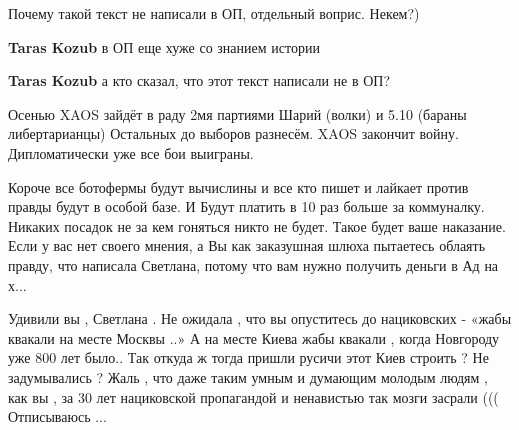 \begin{itemize}
\begin{itemize}
\end{itemize}

 
Почему такой текст не написали в ОП, отдельный воприс. Некем?)

\begin{itemize}
 
\textbf{Taras Kozub} в ОП еще хуже со знанием истории

 
\textbf{Taras Kozub} а кто сказал, что этот текст написали не в ОП?

 

Осенью XAOS зайдёт в раду 2мя партиями Шарий (волки) и 5.10 (бараны
либертарианцы) Остальных до выборов разнесём. XAOS закончит войну.
Дипломатически уже все бои выиграны.

Короче все ботофермы будут вычислины и все кто пишет и лайкает против правды
будут в особой базе. И Будут платить в 10 раз больше за коммуналку. Никаких
посадок не за кем гоняться никто не будет. Такое будет ваше наказание. Если у
вас нет своего мнения, а Вы как заказушная шлюха пытаетесь облаять правду, что
написала Светлана, потому что вам нужно получить деньги в Ад на х...

\end{itemize}

 

Удивили вы , Светлана . Не ожидала , что вы опуститесь до нациковских - «жабы
квакали на месте Москвы ..» А на месте Киева жабы квакали , когда Новгороду уже
800 лет было.. Так откуда ж тогда пришли русичи этот Киев строить ? Не
задумывались ? Жаль , что даже таким умным и думающим молодым людям , как вы ,
за 30 лет нациковской пропагандой и ненавистью так мозги засрали (((
Отписываюсь ...


\end{itemize}
